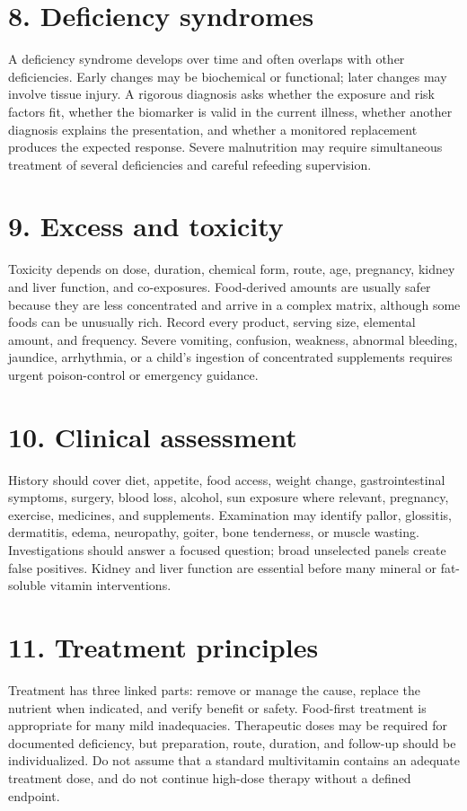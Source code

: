 {\newpage\section*{8. Deficiency syndromes}
A deficiency syndrome develops over time and often overlaps with other deficiencies. Early changes may be biochemical or functional; later changes may involve tissue injury. A rigorous diagnosis asks whether the exposure and risk factors fit, whether the biomarker is valid in the current illness, whether another diagnosis explains the presentation, and whether a monitored replacement produces the expected response. Severe malnutrition may require simultaneous treatment of several deficiencies and careful refeeding supervision.

\newpage\section*{9. Excess and toxicity}
Toxicity depends on dose, duration, chemical form, route, age, pregnancy, kidney and liver function, and co-exposures. Food-derived amounts are usually safer because they are less concentrated and arrive in a complex matrix, although some foods can be unusually rich. Record every product, serving size, elemental amount, and frequency. Severe vomiting, confusion, weakness, abnormal bleeding, jaundice, arrhythmia, or a child's ingestion of concentrated supplements requires urgent poison-control or emergency guidance.

\newpage\section*{10. Clinical assessment}
History should cover diet, appetite, food access, weight change, gastrointestinal symptoms, surgery, blood loss, alcohol, sun exposure where relevant, pregnancy, exercise, medicines, and supplements. Examination may identify pallor, glossitis, dermatitis, edema, neuropathy, goiter, bone tenderness, or muscle wasting. Investigations should answer a focused question; broad unselected panels create false positives. Kidney and liver function are essential before many mineral or fat-soluble vitamin interventions.

\newpage\section*{11. Treatment principles}
Treatment has three linked parts: remove or manage the cause, replace the nutrient when indicated, and verify benefit or safety. Food-first treatment is appropriate for many mild inadequacies. Therapeutic doses may be required for documented deficiency, but preparation, route, duration, and follow-up should be individualized. Do not assume that a standard multivitamin contains an adequate treatment dose, and do not continue high-dose therapy without a defined endpoint.

}
